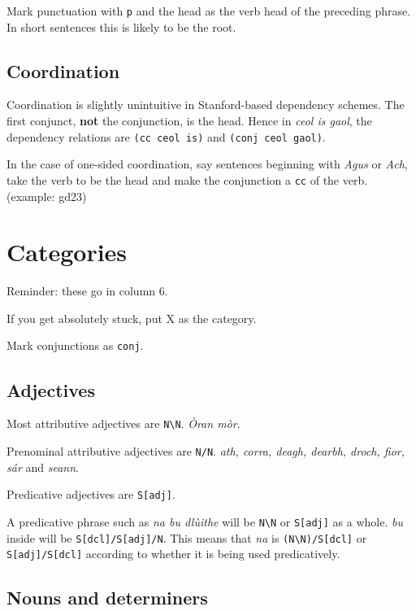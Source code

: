 \documentclass[a4paper]{article}
\begin{document}
 Mark punctuation with \texttt{p} and the head as the verb head of the preceding phrase. In short sentences this is likely to be the root.

\subsection{Coordination}

 Coordination is slightly unintuitive in Stanford-based dependency schemes. The first conjunct, \textbf{not} the conjunction, is the head. Hence in \textit{ceol is gaol}, the dependency relations are \texttt{(cc ceol is)} and \texttt{(conj ceol gaol)}.

 In the case of one-sided coordination, say sentences beginning with \textit{Agus} or \textit{Ach}, take the verb to be the head and make the conjunction a \texttt{cc} of the verb. (example: gd23)

\section{Categories}

Reminder: these go in column 6.

 If you get absolutely stuck, put X as the category.

 Mark conjunctions as \texttt{conj}.

\subsection{Adjectives}

 Most attributive adjectives are \texttt{N\textbackslash N}. \textit{\`Oran m\`or}.

 Prenominal attributive adjectives are \texttt{N/N}. \textit{ath, corra, deagh, dearbh, droch, fior, s\'ar} and \textit{seann}.

 Predicative adjectives are \texttt{S[adj]}.

 A predicative phrase such as \textit{na bu dl\`uithe} will be \texttt{N\textbackslash N} or \texttt{S[adj]} as a whole. \textit{bu} inside will be \texttt{S[dcl]/S[adj]/N}. This means that \textit{na} is \texttt{(N\textbackslash N)/S[dcl]} or \texttt{S[adj]/S[dcl]} according to whether it is being used predicatively.

\subsection{Nouns and determiners}
\end{document}
